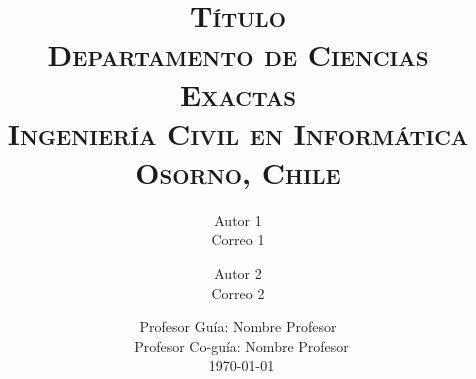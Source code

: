 \setlength{\unitlength}{1 cm} %
\thispagestyle{empty}

\AddToShipoutPicture*{\BackgroundPic}

   \title{\vspace{-2cm}\scshape\Huge{Título}\\\vspace{1cm}
        \Large Departamento de Ciencias Exactas\\
        \Large Ingeniería Civil en Informática\\\large Osorno, Chile}
   \author{
      Autor 1\\
      Correo 1
      \and Autor 2\\
      Correo 2}
    
   \date{Profesor Guía: Nombre Profesor\\\
   Profesor Co-guía: Nombre Profesor\\\
   \today}
   \maketitle
   \ClearShipoutPicture